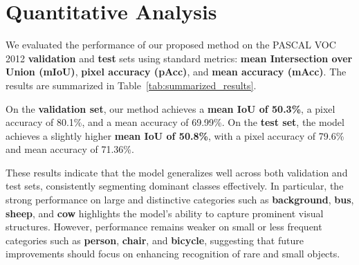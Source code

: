 \section{Quantitative Analysis}
\label{sec:quantitative_analysis}

We evaluated the performance of our proposed method on the PASCAL VOC 2012 \textbf{validation} and \textbf{test} sets using standard metrics: \textbf{mean Intersection over Union (mIoU)}, \textbf{pixel accuracy (pAcc)}, and \textbf{mean accuracy (mAcc)}. The results are summarized in Table~\ref{tab:summarized_results}. 

On the \textbf{validation set}, our method achieves a \textbf{mean IoU of 50.3\%}, a pixel accuracy of 80.1\%, and a mean accuracy of 69.99\%.  
On the \textbf{test set}, the model achieves a slightly higher \textbf{mean IoU of 50.8\%}, with a pixel accuracy of 79.6\% and mean accuracy of 71.36\%.  

These results indicate that the model generalizes well across both validation and test sets, consistently segmenting dominant classes effectively. In particular, the strong performance on large and distinctive categories such as \textbf{background}, \textbf{bus}, \textbf{sheep}, and \textbf{cow} highlights the model's ability to capture prominent visual structures. However, performance remains weaker on small or less frequent categories such as \textbf{person}, \textbf{chair}, and \textbf{bicycle}, suggesting that future improvements should focus on enhancing recognition of rare and small objects.




